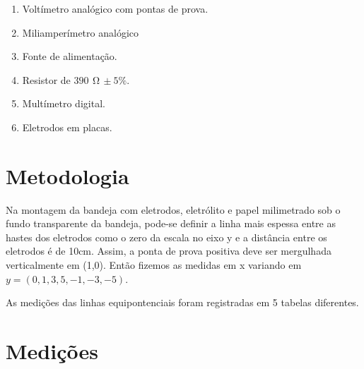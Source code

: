 \documentclass[a4paper,12pt]{article}
\begin{document}
\begin{enumerate}[label=\alph*.]
    \item Voltímetro analógico com pontas de prova. \par\vspace{0.5\baselineskip}

    \item Miliamperímetro analógico \par\vspace{0.5\baselineskip}

    \item Fonte de alimentação. \par\vspace{0.5\baselineskip}
    
    \item Resistor de $\SI{390}{\,\ohm}\,\pm 5\%$. \par\vspace{0.5\baselineskip}
    
    \item Multímetro digital. \par\vspace{0.5\baselineskip}
    
    \item Eletrodos em placas. \par\vspace{0.5\baselineskip}
  
    \end{enumerate}

\section{Metodologia}

    Na montagem da bandeja com eletrodos, eletrólito e papel milimetrado sob o fundo transparente da bandeja, pode-se definir a linha mais espessa entre as hastes dos eletrodos como o zero da escala no eixo y e a distância entre os eletrodos é de 10cm. Assim, a ponta de prova positiva deve ser mergulhada verticalmente em (1,0). Então fizemos as medidas em x variando em $y = (0, 1, 3, 5, -1, -3, -5)$.

    As medições das linhas equipontenciais foram registradas em 5 tabelas diferentes.

\section{Medições}
\end{document}
